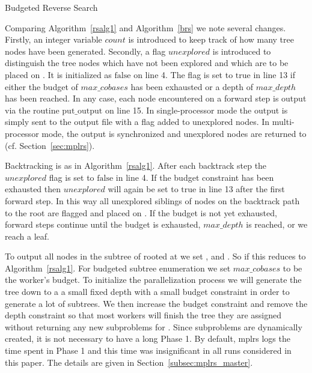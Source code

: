 \documentclass[a4paper,11pt]{article}   \usepackage{authblk} \usepackage[top=1.9cm,bottom=1.9cm,left=1.9cm,right=1.9cm]{geometry}
\newcommand{\progname}{\textsf}
\newcommand{\mplrs}{\progname{mplrs}\xspace}
\newcommand{\mymaxdepth}{\ensuremath{\mathit{max\_depth}}\xspace}
\newcommand{\maxcobases}{\ensuremath{\mathit{max\_cobases}}\xspace}
\newcommand{\startvertex}{\ensuremath{\mathit{start\_vertex}}\xspace}
\newcommand{\unexplored}{\ensuremath{\mathit{unexplored}}\xspace}
\newcommand{\myfalse}{\ensuremath{\textrm{false}}\xspace}
\newcommand{\mytrue}{\ensuremath{\textrm{true}}\xspace}
\newcommand{\mycount}{\ensuremath{\mathit{count}}\xspace}
\newcommand{\putoutput}{\ensuremath{\textrm{put\_output}}\xspace}
\begin{document}
\begin{algorithm}[htb]
\begin{algorithmic}[1]
\Procedure{brs}{\startvertex, , , , \mymaxdepth, \maxcobases }
        \State 
        \Repeat
        \State 
                \State 
                \If {}  
                        \State 
                        \State  
                        \State 
                        \State 
                         
                            \State 
                        \EndIf
                        \State 
                \EndIf
        \EndWhile
        \If {}   
                \State 
                \State 
        \EndIf
\EndProcedure
\end{algorithmic}
\caption{Budgeted Reverse Search}
\label{brs}
\end{algorithm}
Comparing Algorithm~\ref{rsalg1} and Algorithm~\ref{brs} we note several changes. 
Firstly, an integer variable \mycount is introduced to keep track
of how many tree nodes have been generated. 
Secondly, a flag \unexplored is introduced to distinguish the tree nodes which have
not been explored and which are to be placed on . It is initialized as \myfalse on line 4.
The flag is set to \mytrue in line 13 if either 
the budget of \maxcobases has been exhausted
or a depth of \mymaxdepth has been reached. 
In any case, each node encountered on a forward step is output via the routine \putoutput
on line 15.
In single-processor mode the output is simply sent to the output file with a flag added
to unexplored nodes. In multi-processor mode, the output is synchronized and
unexplored nodes are returned to  (cf. Section~\ref{sec:mplrs}).

Backtracking is as in Algorithm~\ref{rsalg1}.
After each backtrack step the \unexplored flag is set to \myfalse in line 4.
If the budget constraint has been exhausted then \unexplored will again be set
to \mytrue in line 13 after the first forward step.
In this way all unexplored siblings of nodes on the backtrack path to the root are flagged
and placed on . If the budget is not yet exhausted, forward steps continue until the budget is exhausted, \mymaxdepth is reached, or we reach a leaf.

To output all nodes in the subtree of  rooted at  we set  
,  and .
So if  this reduces to Algorithm~\ref{rsalg1}.
For budgeted subtree enumeration we set \maxcobases to be the worker's budget.
To initialize the parallelization process we will generate the tree  down to a 
a small fixed depth with a small budget constraint in order to generate a
lot of subtrees. We then increase the budget constraint 
and remove the depth constraint so that most workers will finish the tree they
are assigned without returning any new subproblems for .
Since subproblems are dynamically created, it is not necessary to have a long
Phase 1.  By default, \mplrs logs the time spent in Phase 1 and this time was
insignificant in all runs considered in this paper.
The details are given in Section~\ref{subsec:mplrs_master}.
\end{document}
